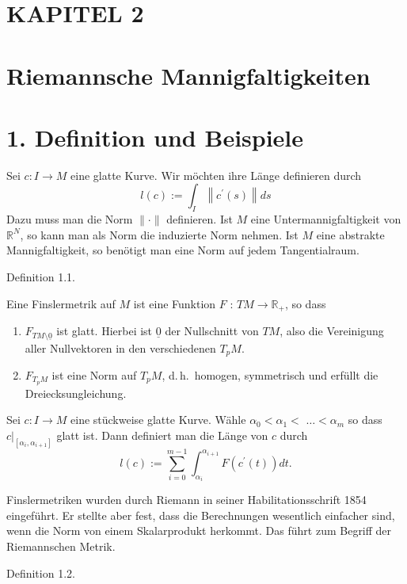 \documentclass[10pt, letterpaper]{article}
\begin{document}
\pagebreak


\section*{KAPITEL 2}
\section*{Riemannsche Mannigfaltigkeiten}
\section*{1. Definition und Beispiele}


Sei $c: I \rightarrow M$ eine glatte Kurve. Wir möchten ihre Länge definieren durch
$$
l(c):=\int_{I}\left\|c^{\prime}(s)\right\| d s
$$
Dazu muss man die Norm $\|\cdot\|$ definieren. Ist $M$ eine Untermannigfaltigkeit von $\mathbb{R}^{N}$, so kann man als Norm die induzierte Norm nehmen. Ist $M$ eine abstrakte Mannigfaltigkeit, so benötigt man eine Norm auf jedem Tangentialraum.



Definition 1.1. 


Eine Finslermetrik auf $M$ ist eine Funktion $F$ : $T M \rightarrow \mathbb{R}_{+}$, so dass\\
\begin{enumerate}
  \item $F_{TM \setminus \underline{0}}$ ist glatt. Hierbei ist $\underline{0}$ der Nullschnitt von $TM$, also die Vereinigung aller Nullvektoren in den verschiedenen $T_p M$.
  \item $F_{T_p M}$ ist eine Norm auf $T_p M$, d.\,h.\ homogen, symmetrisch und erfüllt die Dreiecksungleichung.
\end{enumerate}



Sei $c: I \rightarrow M$ eine stückweise glatte Kurve. Wähle $\alpha_{0}<\alpha_{1}<$ $\ldots<\alpha_{m}$ so dass $\left.c\right|_{\left[\alpha_{i}, \alpha_{i+1}\right]}$ glatt ist. Dann definiert man die Länge von $c$ durch
$$
l(c):=\sum_{i=0}^{m-1} \int_{\alpha_{i}}^{\alpha_{i+1}} F\left(c^{\prime}(t)\right) d t .
$$

Finslermetriken wurden durch Riemann in seiner Habilitationsschrift 1854 eingeführt. Er stellte aber fest, dass die Berechnungen wesentlich einfacher sind, wenn die Norm von einem Skalarprodukt herkommt. Das führt zum Begriff der Riemannschen Metrik.


Definition 1.2. 
\end{document}
